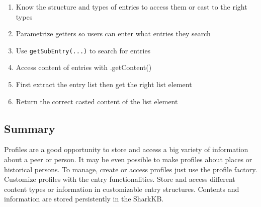 \documentclass[12pt]{article}
\begin{document}
\begin{enumerate}
\item Know the structure and types of entries to access them or cast to the right types
\item Parametrize getters so users can enter what entries they search
\item Use {\tt getSubEntry(...)} to search for entries
\item Access content of entries with .getContent()
\item First extract the entry list then get the right list element
\item Return the correct casted content of the list element
\end{enumerate}

\subsection{Summary}
Profiles are a good opportunity to store and access a big variety of information about a peer or person. It may be even possible to make profiles about places or historical persons. To manage, create or access profiles just use the profile factory. Customize profiles with the entry functionalities. Store and access different  content types or information in customizable entry structures. Contents and information are stored persistently in the SharkKB. 
\end{document}
